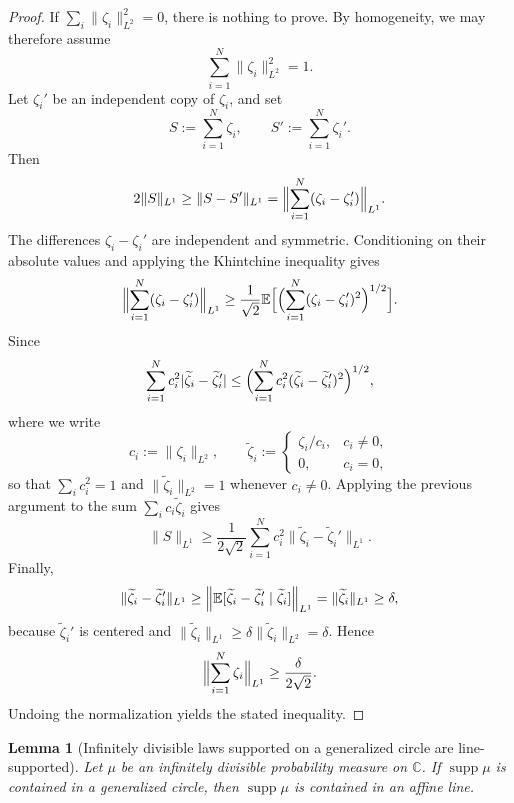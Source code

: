 \documentclass[11pt]{amsart}
\newtheorem{lemma}[theorem]{Lemma}
\newcommand{\E}{\mathbb{E}}
\newcommand{\C}{\mathbb{C}}
\newcommand{\supp}{\operatorname{supp}}
\begin{document}
\begin{proof}
If $\sum_i \|\zeta_i\|_{L^2}^2=0$, there is nothing to prove.  By homogeneity, we
may therefore assume
\[
  \sum_{i=1}^N \|\zeta_i\|_{L^2}^2=1.
\]
Let $\zeta_i'$ be an independent copy of $\zeta_i$, and set
\[
  S:=\sum_{i=1}^N \zeta_i,
  \qquad
  S':=\sum_{i=1}^N \zeta_i'.
\]
Then
\[
  2\|S\|_{L^1}\ge \|S-S'\|_{L^1}
  =
  \Bigl\|\sum_{i=1}^N (\zeta_i-\zeta_i')\Bigr\|_{L^1}.
\]
The differences $\zeta_i-\zeta_i'$ are independent and symmetric.  Conditioning
on their absolute values and applying the Khintchine inequality gives
\[
  \Bigl\|\sum_{i=1}^N (\zeta_i-\zeta_i')\Bigr\|_{L^1}
  \ge
  \frac{1}{\sqrt 2}
  \E\Bigl[\Bigl(\sum_{i=1}^N (\zeta_i-\zeta_i')^2\Bigr)^{1/2}\Bigr].
\]
Since
\[
  \sum_{i=1}^N c_i^2 |\widetilde\zeta_i-\widetilde\zeta_i'|
  \le
  \Bigl(\sum_{i=1}^N c_i^2(\widetilde\zeta_i-\widetilde\zeta_i')^2\Bigr)^{1/2},
\]
where we write
\[
  c_i:=\|\zeta_i\|_{L^2},
  \qquad
  \widetilde\zeta_i :=
  \begin{cases}
    \zeta_i/c_i,& c_i\ne 0,\\
    0,& c_i=0,
  \end{cases}
\]
so that $\sum_i c_i^2=1$ and $\|\widetilde\zeta_i\|_{L^2}=1$ whenever $c_i\ne 0$.
Applying the previous argument to the sum $\sum_i c_i \widetilde\zeta_i$ gives
\[
  \|S\|_{L^1}
  \ge
  \frac{1}{2\sqrt 2}
  \sum_{i=1}^N c_i^2
  \|\widetilde\zeta_i-\widetilde\zeta_i'\|_{L^1}.
\]
Finally,
\[
  \|\widetilde\zeta_i-\widetilde\zeta_i'\|_{L^1}
  \ge
  \Bigl\|\E[\widetilde\zeta_i-\widetilde\zeta_i'\mid \widetilde\zeta_i]\Bigr\|_{L^1}
  =
  \|\widetilde\zeta_i\|_{L^1}
  \ge \delta,
\]
because $\widetilde\zeta_i'$ is centered and
$\|\widetilde\zeta_i\|_{L^1}\ge \delta \|\widetilde\zeta_i\|_{L^2}=\delta$.
Hence
\[
  \Bigl\|\sum_{i=1}^N \zeta_i\Bigr\|_{L^1}
  \ge
  \frac{\delta}{2\sqrt 2}.
\]
Undoing the normalization yields the stated inequality.
\end{proof}

\begin{lemma}[Infinitely divisible laws supported on a generalized circle are line-supported]
\label{lem:id-gc-line}
Let $\mu$ be an infinitely divisible probability measure on $\C$.  If
$\supp\mu$ is contained in a generalized circle, then $\supp\mu$ is contained in
an affine line.
\end{lemma}
\end{document}
